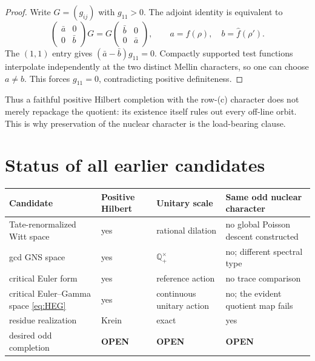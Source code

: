 \documentclass[11pt]{article}
\newcommand{\OPEN}{\textcolor{red!70!black}{\textbf{OPEN}}}
\begin{document}
\begin{proof}
Write $G=(g_{ij})$ with $g_{11}>0$.  The adjoint identity is equivalent to
\[
 \begin{pmatrix}\bar a&0\\0&\bar b\end{pmatrix}G
 =G\begin{pmatrix}\bar b&0\\0&\bar a\end{pmatrix},
 \qquad
 a=\widehat f(\rho),\quad b=\widehat f(\rho').
\]
The $(1,1)$ entry gives $(\bar a-\bar b)g_{11}=0$.  Compactly supported test
functions interpolate independently at the two distinct Mellin characters,
so one can choose $a\ne b$.  This forces $g_{11}=0$, contradicting positive
definiteness.
\end{proof}

Thus a faithful positive Hilbert completion with the row-(c) character does
not merely repackage the quotient: its existence itself rules out every
off-line orbit.  This is why preservation of the nuclear character is the
load-bearing clause.

\section{Status of all earlier candidates}

\begin{center}
\begin{tabular}{>{\raggedright\arraybackslash}p{.30\linewidth}
                >{\centering\arraybackslash}p{.13\linewidth}
                >{\centering\arraybackslash}p{.15\linewidth}
                >{\raggedright\arraybackslash}p{.32\linewidth}}
\toprule
Candidate & Positive Hilbert & Unitary scale & Same odd nuclear character \\
\midrule
Tate-renormalized Witt space & yes & rational dilation & no global Poisson
descent constructed \\
gcd GNS space & yes & $\mathbb Q_+^\times$ & no; different spectral type \\
critical Euler form & yes & reference action & no trace comparison \\
critical Euler--Gamma space \eqref{eq:HEG} & yes & continuous unitary action &
no; the evident quotient map fails \\
residue realization & Krein & exact & yes \\
desired odd completion & \OPEN & \OPEN & \OPEN \\
\bottomrule
\end{tabular}
\end{center}
\end{document}
